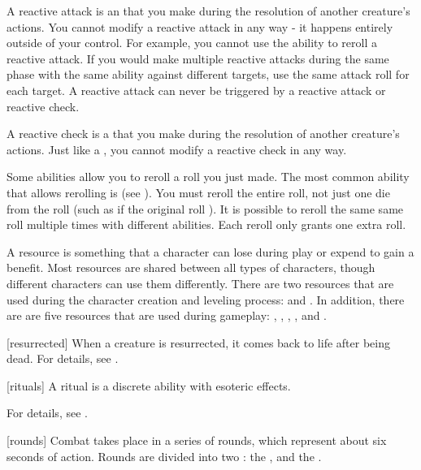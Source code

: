  A reactive attack is an  that you make during the resolution of another creature's actions.
You cannot modify a reactive attack in any way - it happens entirely outside of your control.
For example, you cannot use the  ability to reroll a reactive attack.
If you would make multiple reactive attacks during the same phase with the same ability against different targets, use the same attack roll for each target.
A reactive attack can never be triggered by a reactive attack or reactive check.

 A reactive check is a  that you make during the resolution of another creature's actions.
Just like a , you cannot modify a reactive check in any way.

 Some abilities allow you to reroll a roll you just made.
The most common ability that allows rerolling is  (see ).
You must reroll the entire roll, not just one die from the roll (such as if the original roll ).
It is possible to reroll the same same roll multiple times with different abilities.
Each reroll only grants one extra roll.

 A resource is something that a character can lose during play or expend to gain a benefit.
Most resources are shared between all types of characters, though different characters can use them differently.
There are two resources that are used during the character creation and leveling process:  and .
In addition, there are are five resources that are used during gameplay: , , , , and .

[resurrected] When a creature is resurrected, it comes back to life after being dead.
For details, see .

[rituals] A ritual is a discrete \magical ability with esoteric effects.

For details, see .

[rounds] Combat takes place in a series of rounds, which represent about six seconds of action.
Rounds are divided into two : the , and the .

